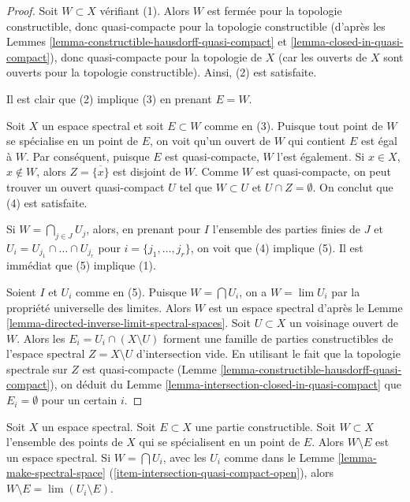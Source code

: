 \begin{proof}
Soit $W \subset X$ vérifiant (1). Alors $W$ est fermée pour la topologie
constructible, donc quasi-compacte pour la topologie constructible (d'après les
Lemmes \ref{lemma-constructible-hausdorff-quasi-compact} et
\ref{lemma-closed-in-quasi-compact}), donc quasi-compacte pour la topologie
de $X$ (car les ouverts de $X$ sont ouverts pour la topologie constructible).
Ainsi, (2) est satisfaite.

\medskip\noindent
Il est clair que (2) implique (3) en prenant $E = W$.

\medskip\noindent
Soit $X$ un espace spectral et soit $E \subset W$ comme en (3).
Puisque tout point de $W$ se spécialise en un point de $E$, on voit qu'un
ouvert de $W$ qui contient $E$ est égal à $W$. Par conséquent, puisque $E$
est quasi-compacte, $W$ l'est également.
Si $x \in X$, $x \not \in W$, alors $Z = \overline{\{x\}}$ est
disjoint de $W$. Comme $W$ est quasi-compacte, on peut trouver un
ouvert quasi-compact $U$ tel que $W \subset U$ et $U \cap Z = \emptyset$.
On conclut que (4) est satisfaite.

\medskip\noindent
Si $W = \bigcap_{j \in J} U_j$, alors, en prenant pour $I$ l'ensemble des
parties finies de $J$ et $U_i = U_{j_1} \cap \ldots \cap U_{j_r}$
pour $i = \{j_1, \ldots, j_r\}$, on voit que (4) implique (5). Il est immédiat
que (5) implique (1).

\medskip\noindent
Soient $I$ et $U_i$ comme en (5).
Puisque $W = \bigcap U_i$, on a $W = \lim U_i$ par la propriété universelle
des limites. Alors $W$ est un espace spectral d'après le
Lemme \ref{lemma-directed-inverse-limit-spectral-spaces}.
Soit $U \subset X$ un voisinage ouvert de $W$.
Alors les $E_i = U_i \cap (X \setminus U)$ forment une famille de parties
constructibles de l'espace spectral $Z = X \setminus U$
d'intersection vide. En utilisant le fait que la topologie spectrale sur $Z$
est quasi-compacte (Lemme \ref{lemma-constructible-hausdorff-quasi-compact}),
on déduit du
Lemme \ref{lemma-intersection-closed-in-quasi-compact}
que $E_i = \emptyset$ pour un certain $i$.
\end{proof}

\begin{lemma}
\label{lemma-make-spectral-space-minus}
Soit $X$ un espace spectral. Soit $E \subset X$ une partie constructible.
Soit $W \subset X$ l'ensemble des points de $X$ qui se spécialisent
en un point de $E$. Alors $W \setminus E$ est un espace spectral.
Si $W = \bigcap U_i$, avec les $U_i$ comme dans le
Lemme \ref{lemma-make-spectral-space}
(\ref{item-intersection-quasi-compact-open}),
alors $W \setminus E = \lim (U_i \setminus E)$.
\end{lemma}

